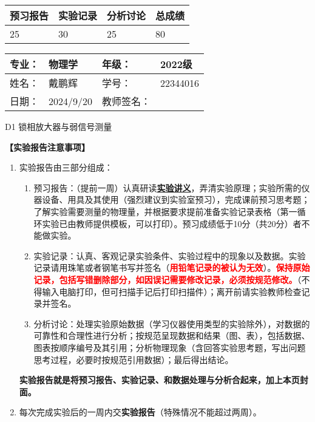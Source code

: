 \documentclass[dvipsnames, svgnames,a4paper,11pt]{article}
\begin{document}
\begin{table}
	\renewcommand\arraystretch{1.7}
	\begin{tabularx}{\textwidth}{
		|X|X|X|X
		|X|X|X|X|}
	\hline
	\multicolumn{2}{|c|}{预习报告}&\multicolumn{2}{|c|}{实验记录}&\multicolumn{2}{|c|}{分析讨论}&\multicolumn{2}{|c|}{总成绩}\\
	\hline
	\LARGE25 & & \LARGE30 & & \LARGE25 & & \LARGE80 & \\
	\hline
	\end{tabularx}
\end{table}


\begin{table}
	\renewcommand\arraystretch{1.7}
	\begin{tabularx}{\textwidth}{|X|X|X|X|}
	\hline
	专业：& 物理学 &年级：& 2022级\\
	\hline
	姓名：& 戴鹏辉  & 学号： & 22344016 \\
	\hline
	日期：& 2024/9/20 & 教师签名：& \\
	\hline
	\end{tabularx}
\end{table}

\begin{center}
	\LARGE D1 \quad 锁相放大器与弱信号测量
\end{center}

\textbf{【实验报告注意事项】}
\begin{enumerate}
	\item 实验报告由三部分组成：
	\begin{enumerate}
		\item 预习报告：（提前一周）认真研读\underline{\textbf{实验讲义}}，弄清实验原理；实验所需的仪器设备、用具及其使用（强烈建议到实验室预习），完成课前预习思考题；了解实验需要测量的物理量，并根据要求提前准备实验记录表格（第一循环实验已由教师提供模板，可以打印）。预习成绩低于10分（共20分）者不能做实验。
	    \item 实验记录：认真、客观记录实验条件、实验过程中的现象以及数据。实验记录请用珠笔或者钢笔书写并签名（\textcolor{red}{\textbf{用铅笔记录的被认为无效}}）。\textcolor{red}{\textbf{保持原始记录，包括写错删除部分，如因误记需要修改记录，必须按规范修改。}}（不得输入电脑打印，但可扫描手记后打印扫描件）；离开前请实验教师检查记录并签名。
	    \item 分析讨论：处理实验原始数据（学习仪器使用类型的实验除外），对数据的可靠性和合理性进行分析；按规范呈现数据和结果（图、表），包括数据、图表按顺序编号及其引用；分析物理现象（含回答实验思考题，写出问题思考过程，必要时按规范引用数据）；最后得出结论。
	\end{enumerate}
	\textbf{实验报告就是将预习报告、实验记录、和数据处理与分析合起来，加上本页封面。}
	\item 每次完成实验后的一周内交\textbf{实验报告}（特殊情况不能超过两周）。
\end{enumerate}
\end{document}

